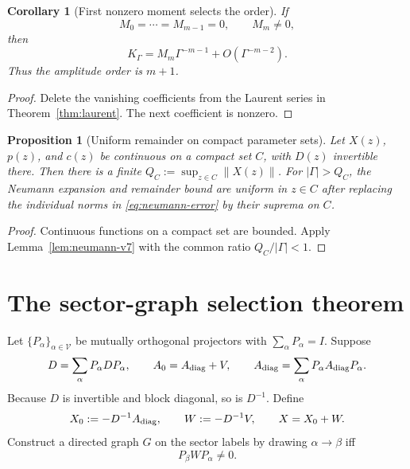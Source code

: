\documentclass[11pt,a4paper]{article}
\newtheorem{corollary}[theorem]{Corollary}
\newtheorem{proposition}[theorem]{Proposition}
\theoremstyle{remark}
\begin{document}
\begin{corollary}[First nonzero moment selects the order]
\label{cor:first-moment}
If
\[
M_0=\cdots=M_{m-1}=0,
\qquad M_m\ne0,
\]
then
\begin{equation}
K_\Gamma=M_m\Gamma^{-m-1}+O(\Gamma^{-m-2}).
\label{eq:first-order}
\end{equation}
Thus the amplitude order is $m+1$.
\end{corollary}

\begin{proof}
Delete the vanishing coefficients from the Laurent series in
Theorem~\ref{thm:laurent}.  The next coefficient is nonzero.
\end{proof}

\begin{proposition}[Uniform remainder on compact parameter sets]
Let $X(z)$, $p(z)$, and $c(z)$ be continuous on a compact set $C$, with
$D(z)$ invertible there.  Then there is a finite
$Q_C:=\sup_{z\in C}\|X(z)\|$.  For $|\Gamma|>Q_C$, the Neumann expansion and
remainder bound are uniform in $z\in C$ after replacing the individual norms
in \eqref{eq:neumann-error} by their suprema on $C$.
\end{proposition}

\begin{proof}
Continuous functions on a compact set are bounded.  Apply
Lemma~\ref{lem:neumann-v7} with the common ratio $Q_C/|\Gamma|<1$.
\end{proof}

\section{The sector-graph selection theorem}

Let $\{P_\alpha\}_{\alpha\in\mathcal V}$ be mutually orthogonal projectors
with $\sum_\alpha P_\alpha=I$.  Suppose
\begin{equation}
D=\sum_\alpha P_\alpha D P_\alpha,
\qquad
A_0=A_{\rm diag}+V,
\qquad
A_{\rm diag}=\sum_\alpha P_\alpha A_{\rm diag}P_\alpha.
\label{eq:sector-decomp}
\end{equation}
Because $D$ is invertible and block diagonal, so is $D^{-1}$.  Define
\begin{equation}
X_0:=-D^{-1}A_{\rm diag},
\qquad
W:=-D^{-1}V,
\qquad X=X_0+W.
\label{eq:X0W}
\end{equation}
Construct a directed graph $G$ on the sector labels by drawing
$\alpha\to\beta$ iff
\begin{equation}
P_\beta W P_\alpha\ne0.
\label{eq:edge}
\end{equation}
\end{document}
